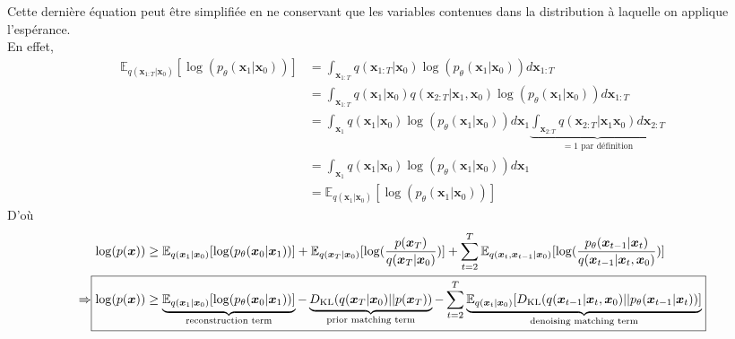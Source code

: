\documentclass{article}
\begin{document}
Cette dernière équation peut être simplifiée en ne conservant que les variables contenues dans la distribution à laquelle on applique l'espérance.\\
En effet,
\begin{align*}
\mathbb{E}_{q(\boldsymbol{x}_{1:T}|\boldsymbol{x}_{0})}[\log(p_{\theta}(\boldsymbol{x}_{1}|\boldsymbol{x}_{0}))] &= \int_{\boldsymbol{x}_{1:T}}q(\boldsymbol{x}_{1:T}|\boldsymbol{x}_{0})\log(p_{\theta}(\boldsymbol{x}_{1}|\boldsymbol{x}_{0})) d\boldsymbol{x}_{1:T} \\
&= \int_{\boldsymbol{x}_{1:T}}q(\boldsymbol{x}_{1}|\boldsymbol{x}_{0})q(\boldsymbol{x}_{2:T}|\boldsymbol{x}_{1},\boldsymbol{x}_{0})\log(p_{\theta}(\boldsymbol{x}_{1}|\boldsymbol{x}_{0})) d\boldsymbol{x}_{1:T} \\
&= \int_{\boldsymbol{x}_{1}}q(\boldsymbol{x}_{1}|\boldsymbol{x}_{0})\log(p_{\theta}(\boldsymbol{x}_{1}|\boldsymbol{x}_{0}))d\boldsymbol{x}_1 \underbrace{\int_{\boldsymbol{x}_{2:T}}q(\boldsymbol{x}_{2:T}|\boldsymbol{x}_{1}\boldsymbol{x}_{0}) d\boldsymbol{x}_{2:T}}_{=1 \text{ par définition}} \\
&= \int_{\boldsymbol{x}_{1}}q(\boldsymbol{x}_{1}|\boldsymbol{x}_{0})\log(p_{\theta}(\boldsymbol{x}_{1}|\boldsymbol{x}_{0}))d\boldsymbol{x}_1 \\
&= \mathbb{E}_{q(\boldsymbol{x}_{1}|\boldsymbol{x}_{0})}[\log(p_{\theta}(\boldsymbol{x}_{1}|\boldsymbol{x}_{0}))]
\end{align*}
D'où
\begin{align*}
\log(p(\boldsymbol{x})) &\geq \mathbb{E}_{q(\boldsymbol{x}_{1}|\boldsymbol{x}_0)}[\log(p_{\theta}(\boldsymbol{x}_0|\boldsymbol{x}_1))] + \mathbb{E}_{q(\boldsymbol{x}_{T}|\boldsymbol{x}_0)}[\log(\frac{p(\boldsymbol{x}_T)}{q(\boldsymbol{x}_T|\boldsymbol{x}_{0})})] + \sum_{t=2}^T \mathbb{E}_{q(\boldsymbol{x}_t, \boldsymbol{x}_{t-1}|\boldsymbol{x}_0)}[\log(\frac{p_{\theta}(\boldsymbol{x}_{t-1}|\boldsymbol{x}_t)}{q(\boldsymbol{x}_{t-1}|\boldsymbol{x}_t,\boldsymbol{x}_{0})})] \\
\Rightarrow \Aboxed{\log(p(\boldsymbol{x})) &\geq \underbrace{\mathbb{E}_{q(\boldsymbol{x}_{1}|\boldsymbol{x}_{0})} [\log(p_{\theta}(\boldsymbol{x}_{0}|\boldsymbol{x}_{1}))]}_{\text{reconstruction term}} - \underbrace{D_{\text{KL}}(q(\boldsymbol{x}_{T}|\boldsymbol{x}_{0}) || p(\boldsymbol{x}_T))}_{\text{prior matching term}} - \sum_{t=2}^T \underbrace{\mathbb{E}_{q(\boldsymbol{x}_{t}|\boldsymbol{x}_{0})} [D_{\text{KL}}(q(\boldsymbol{x}_{t-1}|\boldsymbol{x}_{t},\boldsymbol{x}_{0}) || p_{\theta}(\boldsymbol{x}_{t-1}|\boldsymbol{x}_{t}))]}_{\text{denoising matching term}}}
\end{align*}
\end{document}
